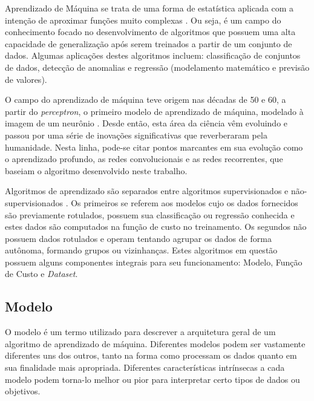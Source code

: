 Aprendizado de Máquina se trata de uma forma de estatística aplicada com a intenção de aproximar funções muito complexas \cite{GoodBengCour16}. Ou seja, é um campo do conhecimento focado no desenvolvimento de algoritmos que possuem uma alta capacidade de generalização após serem treinados a partir de um conjunto de dados. Algumas aplicações destes algoritmos incluem: classificação de conjuntos de dados, detecção de anomalias e regressão (modelamento matemático e previsão de valores).

O campo do aprendizado de máquina teve origem nas décadas de 50 e 60, a partir do \textit{perceptron}, o primeiro modelo de aprendizado de máquina, modelado à imagem de um neurônio \cite{minsky69perceptrons}. Desde então, esta área da ciência vêm evoluindo e passou por uma série de  inovações significativas que reverberaram pela humanidade. Nesta linha, pode-se citar pontos marcantes em sua evolução como o aprendizado profundo, as redes convolucionais e as redes recorrentes, que baseiam o algoritmo desenvolvido neste trabalho.

Algoritmos de aprendizado são separados entre algoritmos supervisionados e não-supervisionados \cite{bishop1995neural}. Os primeiros se referem aos modelos cujo os dados fornecidos são previamente rotulados, possuem sua classificação ou regressão conhecida e estes dados são computados na função de custo no treinamento. Os segundos não possuem dados rotulados e operam tentando agrupar os dados de forma autônoma, formando grupos ou vizinhanças. Estes algoritmos em questão possuem alguns componentes integrais para seu funcionamento: Modelo, Função de Custo e \textit{Dataset}.

\subsection{\textbf{Modelo}}

O modelo é um termo utilizado para descrever a arquitetura geral de um algoritmo de aprendizado de máquina. Diferentes modelos podem ser vastamente diferentes uns dos outros, tanto na forma como processam os dados quanto em sua finalidade mais apropriada. Diferentes características intrínsecas a cada modelo podem torna-lo melhor ou pior para interpretar certo tipos de dados ou objetivos.


